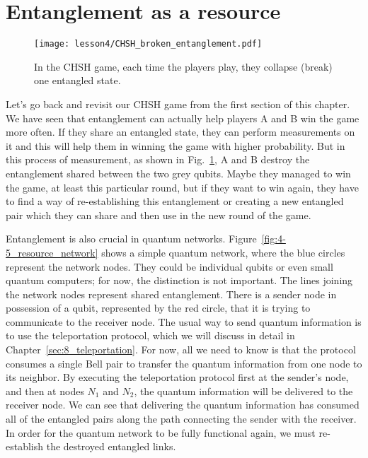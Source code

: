

\section{Entanglement as a resource}

\begin{figure}[t]
   \centering
    \texttt{[image: lesson4/CHSH\_broken\_entanglement.pdf]}
    
        \caption[CHSH game collapses entanglement.]{In the CHSH game, each time the players play, they collapse (break) one entangled state.}
    
    \label{fig:chsh-broken}
\end{figure}


Let's go back and revisit our CHSH game from the first section of this chapter. We have seen that entanglement can actually help players A and B win the game more often. If they share an entangled state, they can perform measurements on it and this will help them in winning the game with higher probability. But in this process of measurement, as shown in Fig.~\ref{fig:chsh-broken}, A and B destroy the entanglement shared between the two grey qubits.  Maybe they managed to win the game, at least this particular round, but if they want to win again, they have to find a way of re-establishing this entanglement or creating a new entangled pair which they can share and then use in the new round of the game. 

Entanglement is also crucial in quantum networks.
Figure~\ref{fig:4-5_resource_network} shows a simple quantum network, where the blue circles represent the network nodes.
They could be individual qubits or even small quantum computers; for now, the distinction is not important.
The lines joining the network nodes represent shared entanglement.
There is a sender node in possession of a qubit, represented by the red circle, that it is trying to communicate to the receiver node.
The usual way to send quantum information is to use the teleportation protocol, which we will discuss in detail in Chapter~\ref{sec:8_teleportation}.
For now, all we need to know is that the protocol consumes a single Bell pair to transfer the quantum information from one node to its neighbor.
By executing the teleportation protocol first at the sender's node, and then at nodes $N_1$ and $N_2$, the quantum information will be delivered to the receiver node.
We can see that delivering the quantum information has consumed all of the entangled pairs along the path connecting the sender with the receiver.
In order for the quantum network to be fully functional again, we must re-establish the destroyed entangled links.

